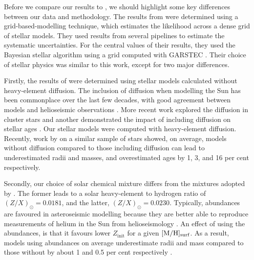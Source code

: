 Before we compare our results to , we should highlight some key differences between our data and methodology. The results from  were determined using a grid-based-modelling technique, which estimates the likelihood across a dense grid of stellar models. They used results from several pipelines to estimate the systematic uncertainties. For the central values of their results, they used the Bayesian stellar algorithm \citep[BASTA;][]{SilvaAguirre.Davies.ea2015} using a grid computed with \textsc{GARSTEC} \citep{Weiss.Schlattl2008}. Their choice of stellar physics was similar to this work, except for two major differences.

Firstly, the results of  were determined using stellar models calculated without heavy-element diffusion. The inclusion of diffusion when modelling the Sun has been commonplace over the last few decades, with good agreement between models and helioseismic observations \citep{Christensen-Dalsgaard.Proffitt.ea1993, Bahcall.Pinsonneault.ea1995}. More recent work explored the diffusion in cluster stars \citep{Korn.Grundahl.ea2007, Onehag.Gustafsson.ea2014} and another demonstrated the impact of including diffusion on stellar ages \citep{Dotter.Conroy.ea2017}. Our stellar models were computed with heavy-element diffusion. Recently, work by \citet{Nsamba.Campante.ea2018} on a similar sample of stars showed, on average, models without diffusion compared to those including diffusion can lead to underestimated radii and masses, and overestimated ages by 1, 3, and 16 per cent respectively.

Secondly, our choice of \citet{Asplund.Grevesse.ea2009} solar chemical mixture differs from the \citet{Grevesse.Sauval1998} mixtures adopted by . The former leads to a solar heavy-element to hydrogen ratio of $(Z/X)_\odot = 0.0181$, and the latter, $(Z/X)_\odot = 0.0230$. Typically, \citet{Grevesse.Sauval1998} abundances are favoured in asteroseismic modelling because they are better able to reproduce measurements of helium in the Sun from helioseismology \citep{Serenelli.Basu.ea2009}. An effect of using the \citet{Asplund.Grevesse.ea2009} abundances, is that it favours lower $Z_\mathrm{init}$ for a given $[\mathrm{M}/\mathrm{H}]_\mathrm{surf}$. As a result, models using \citet{Grevesse.Sauval1998} abundances on average underestimate radii and mass compared to those without by about 1 and 0.5 per cent respectively \citep{Nsamba.Campante.ea2018}.

